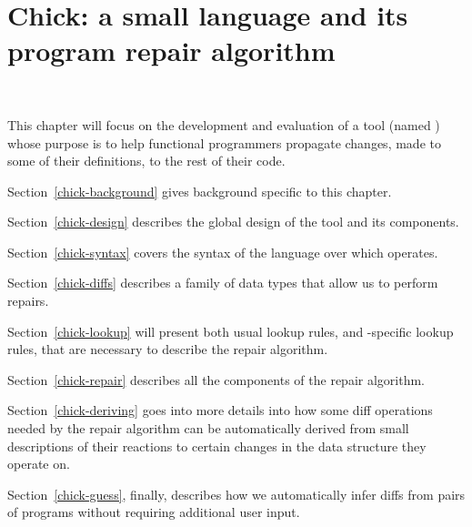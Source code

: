 \chapter{Chick: a small language and its program repair algorithm}~\label{chick}

This chapter will focus on the development and evaluation of a tool (named
\Chick{}\footnotemark{}) whose purpose is to help functional programmers
propagate changes, made to some of their definitions, to the rest of their code.


Section~\ref{chick-background} gives background specific to this chapter.

Section~\ref{chick-design} describes the global design of the tool and its
components.

Section~\ref{chick-syntax} covers the syntax of the language over which \Chick{}
operates.

Section~\ref{chick-diffs} describes a family of data types that allow us to
perform repairs.

Section~\ref{chick-lookup} will present both usual lookup rules, and
\Chick{}-specific lookup rules, that are necessary to describe the repair
algorithm.

Section~\ref{chick-repair} describes all the components of the repair algorithm.

Section~\ref{chick-deriving} goes into more details into how some diff
operations needed by the repair algorithm can be automatically derived from
small descriptions of their reactions to certain changes in the data structure
they operate on.

Section~\ref{chick-guess}, finally, describes how we automatically infer diffs
from pairs of programs without requiring additional user input.









